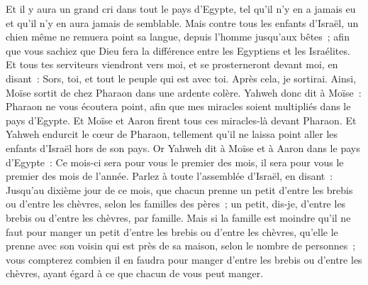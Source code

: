 \begin{multicols}{2}
Et il y aura un grand cri dans tout le pays d'Egypte, tel qu'il n'y en a jamais eu et qu'il n'y en aura jamais de semblable.
Mais contre tous les enfants d'Israël, un chien même ne remuera point sa langue, depuis l'homme jusqu'aux bêtes~; afin que vous sachiez que Dieu fera la différence entre les Egyptiens et les Israélites.
Et tous tes serviteurs viendront vers moi, et se prosterneront devant moi, en disant~: Sors, toi, et tout le peuple qui est avec toi. Après cela, je sortirai. Ainsi, Moïse sortit de chez Pharaon dans une ardente colère.
Yahweh donc dit à Moïse~: Pharaon ne vous écoutera point, afin que mes miracles soient multipliés dans le pays d'Egypte.
Et Moïse et Aaron firent tous ces miracles-là devant Pharaon. Et Yahweh endurcit le cœur de Pharaon, tellement qu'il ne laissa point aller les enfants d'Israël hors de son pays.
\VerseOne{}Or Yahweh dit à Moïse et à Aaron dans le pays d'Egypte~:
Ce mois-ci sera pour vous le premier des mois, il sera pour vous le premier des mois de l'année.
Parlez à toute l'assemblée d'Israël, en disant~: Jusqu'au dixième jour de ce mois, que chacun prenne un petit d'entre les brebis ou d'entre les chèvres, selon les familles des pères~; un petit, dis-je, d'entre les brebis ou d'entre les chèvres, par famille.
Mais si la famille est moindre qu'il ne faut pour manger un petit d'entre les brebis ou d'entre les chèvres, qu'elle le prenne avec son voisin qui est près de sa maison, selon le nombre de personnes~; vous compterez combien il en faudra pour manger d'entre les brebis ou d'entre les chèvres, ayant égard à ce que chacun de vous peut manger.

\end{multicols}
